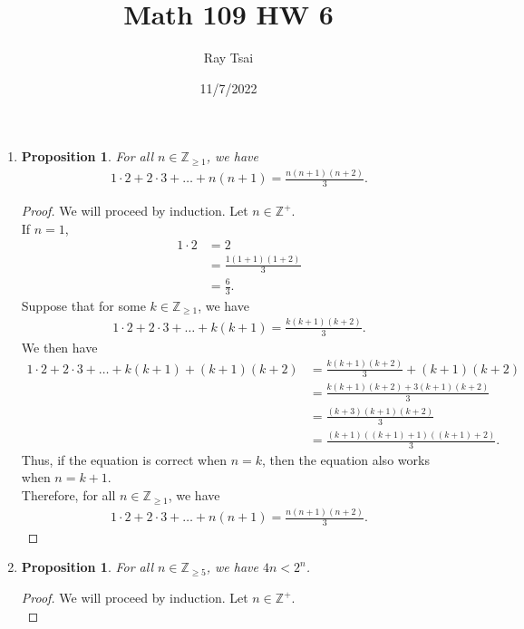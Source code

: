 \documentclass{article}
\title{Math 109 HW 6}
\author{Ray Tsai}
\date{11/7/2022}
\newtheorem{prop}[thm]{Proposition}
\begin{document}
 

\maketitle 

\begin{enumerate}
\item 
\begin{prop}
    For all $n \in \mathbb{Z}_{\geq 1}$, we have 
    \begin{gather}
        1\cdot2 + 2\cdot3 + \ldots + n(n+1) = \frac{n(n+1)(n+2)}{3}.
    \end{gather}
\end{prop}
\begin{proof}
    We will proceed by induction. Let $n \in \mathbb{Z}^+$. \\
    If $n = 1$,
    \begin{align}
        1\cdot2 &= 2 \\
                &= \frac{1(1+1)(1+2)}{3} \\
                &= \frac{6}{3}.
    \end{align}
    Suppose that for some $k \in \mathbb{Z}_{\geq 1}$, we have
    \begin{gather}
        1\cdot2 + 2\cdot3 + \ldots + k(k+1) = \frac{k(k+1)(k+2)}{3}.
    \end{gather}
    We then have
    \begin{align}
        1\cdot2 + 2\cdot3 + \ldots + k(k+1) + (k+1)(k+2) &= \frac{k(k+1)(k+2)}{3} + (k+1)(k+2) \\
        &= \frac{k(k+1)(k+2) + 3(k+1)(k+2)}{3} \\
        &= \frac{(k+3)(k+1)(k+2)}{3} \\
        &= \frac{(k+1)((k+1)+1)((k+1)+2)}{3}.
    \end{align}
    Thus, if the equation is correct when $n = k$, then the equation also works when $n = k + 1$. \\

    Therefore, for all $n \in \mathbb{Z}_{\geq 1}$, we have 
    \begin{gather}
        1\cdot2 + 2\cdot3 + \ldots + n(n+1) = \frac{n(n+1)(n+2)}{3}.
    \end{gather}
\end{proof}

\item 
\begin{prop}
    For all $n \in \mathbb{Z}_{\geq 5}$, we have $4n < 2^n$.
\end{prop}
\begin{proof}
    We will proceed by induction. Let $n \in \mathbb{Z}^+$.\\


\end{proof}
\end{enumerate}
\end{document}
